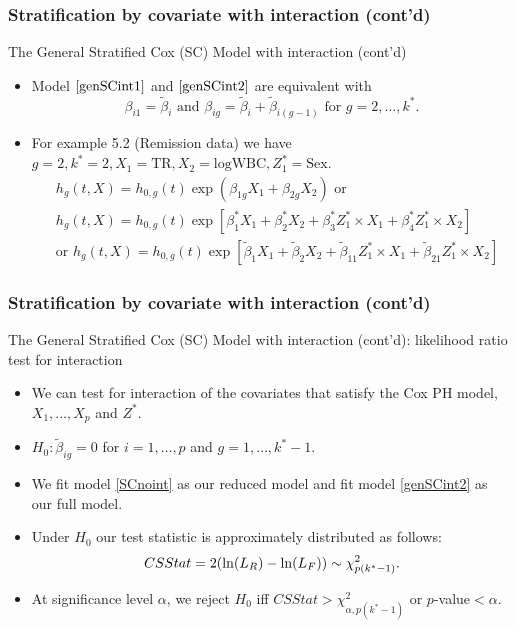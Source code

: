 \documentclass{beamer}
\theoremstyle{definition}
\begin{document}
\begin{frame}
\frametitle{Stratification by covariate with interaction (cont'd)}
\begin{block}{The General Stratified Cox (SC) Model with interaction (cont'd)}
\begin{itemize}
\item Model $\ref{genSCint1}$ and $\ref{genSCint2}$ are equivalent with
\[ \beta_{i1} = \tilde{\beta}_i \text{ and } \beta_{ig} = \tilde{\beta}_{i} + \tilde{\beta}_{i(g-1)} \text{ for } g=2,\ldots,k^*.
\]
\item For example 5.2 (Remission data) we have $g=2, k^*=2, X_1=\text{TR}, X_2=\text{logWBC}, Z_1^*=\text{Sex}$.
\begin{align*}
&h_g(t,X) = h_{0,g}(t) \exp(\beta_{1g} X_1 + \beta_{2g} X_2)  \text{ or } \\
&h_g(t,X) = h_{0,g}(t)\exp[\beta_1^*X_1  + \beta_2^*X_2 + \beta_3^*Z_1^*\times X_1 + \beta_4^*Z_1^*\times X_2 ]  \\
&\text{or } h_g(t,X) = h_{0,g}(t)\exp[\tilde{\beta}_1X_1  + \tilde{\beta}_2X_2 + \tilde{\beta}_{11}Z_1^*\times X_1 + \tilde{\beta}_{21}Z_1^*\times X_2 ]
\end{align*}
\end{itemize}
\end{block}
\end{frame}

\begin{frame}
\frametitle{Stratification by covariate with interaction (cont'd)}
\begin{block}{The General Stratified Cox (SC) Model with interaction (cont'd): likelihood ratio test for interaction}
\begin{itemize}
\item We can test for interaction of the covariates that satisfy the Cox PH model, $X_1,\ldots,X_p$ and $Z^*$.
\item $H_0: \tilde{\beta}_{ig} =0$ for $i=1,\ldots,p$ and $g=1,\ldots,k^*-1$.
\item We fit model \ref{SCnoint} as our reduced model and fit model \ref{genSCint2} as our full model.
\item Under $H_0$ our test statistic is approximately distributed as follows:
\[
CSStat= \-2(\ln(L_R) - \ln(L_F)) \sim \chi^2_{p(k^*-1)}.
\]
\item At significance level $\alpha$, we reject $H_0$  iff $CSStat>\chi^2_{\alpha,p(k^*-1)}$ or $p$-value$<\alpha$.
\end{itemize}
\end{block}
\end{frame}
\end{document}
